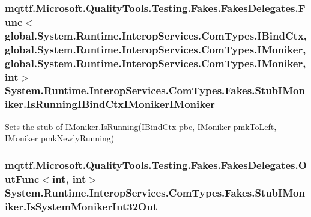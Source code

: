 \hypertarget{class_system_1_1_runtime_1_1_interop_services_1_1_com_types_1_1_fakes_1_1_stub_i_moniker_a84346bebe87d567a8b20e3d2947a4720}{
\subsubsection[{Is\-Running\-I\-Bind\-Ctx\-I\-Moniker\-I\-Moniker}]{\setlength{\rightskip}{0pt plus 5cm}mqttf.\-Microsoft.\-Quality\-Tools.\-Testing.\-Fakes.\-Fakes\-Delegates.\-Func$<$global.\-System.\-Runtime.\-Interop\-Services.\-Com\-Types.\-I\-Bind\-Ctx, global.\-System.\-Runtime.\-Interop\-Services.\-Com\-Types.\-I\-Moniker, global.\-System.\-Runtime.\-Interop\-Services.\-Com\-Types.\-I\-Moniker, int$>$ System.\-Runtime.\-Interop\-Services.\-Com\-Types.\-Fakes.\-Stub\-I\-Moniker.\-Is\-Running\-I\-Bind\-Ctx\-I\-Moniker\-I\-Moniker}}\label{class_system_1_1_runtime_1_1_interop_services_1_1_com_types_1_1_fakes_1_1_stub_i_moniker_a84346bebe87d567a8b20e3d2947a4720}


Sets the stub of I\-Moniker.\-Is\-Running(\-I\-Bind\-Ctx pbc, I\-Moniker pmk\-To\-Left, I\-Moniker pmk\-Newly\-Running)

\hypertarget{class_system_1_1_runtime_1_1_interop_services_1_1_com_types_1_1_fakes_1_1_stub_i_moniker_a8f6296dd3045af66a3356b60af53dfea}{
\subsubsection[{Is\-System\-Moniker\-Int32\-Out}]{\setlength{\rightskip}{0pt plus 5cm}mqttf.\-Microsoft.\-Quality\-Tools.\-Testing.\-Fakes.\-Fakes\-Delegates.\-Out\-Func$<$int, int$>$ System.\-Runtime.\-Interop\-Services.\-Com\-Types.\-Fakes.\-Stub\-I\-Moniker.\-Is\-System\-Moniker\-Int32\-Out}}\label{class_system_1_1_runtime_1_1_interop_services_1_1_com_types_1_1_fakes_1_1_stub_i_moniker_a8f6296dd3045af66a3356b60af53dfea}


